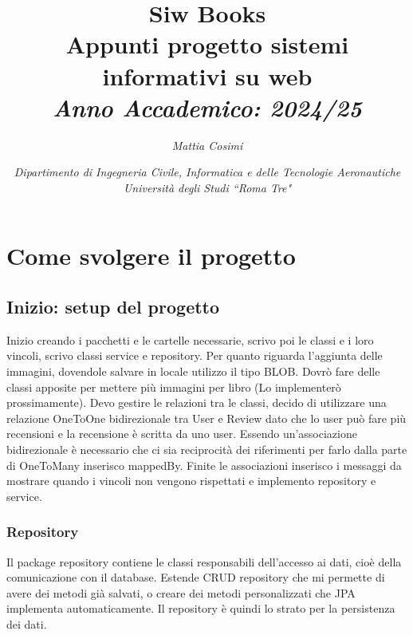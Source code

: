 \documentclass{article}
\numberwithin{equation}{subsection}
\begin{document}
\title{%
    \textbf{Siw Books}  \\ 
    \large Appunti progetto sistemi informativi su web\\
    \textit{Anno Accademico: 2024/25}}
\author{\textit{Mattia Cosimi}}
\date{\textit{Dipartimento di Ingegneria Civile, Informatica e delle Tecnologie Aeronautiche \\
Università degli Studi ``Roma Tre"}}

\maketitle


\clearpage

\pagestyle{fancy}
\fancyhead{}\fancyfoot{}
\fancyfoot[C]{\thepage}

\tableofcontents

\clearpage


\section{Come svolgere il progetto}
\subsection{Inizio: setup del progetto}
Inizio creando i pacchetti e le cartelle necessarie, scrivo poi le classi e i loro vincoli, scrivo classi service e repository. Per quanto riguarda l'aggiunta delle immagini, dovendole salvare in locale utilizzo il tipo BLOB. Dovrò fare delle classi apposite per mettere più immagini per libro (Lo implementerò prossimamente). Devo gestire le relazioni tra le classi, decido di utilizzare una relazione OneToOne bidirezionale tra User e Review dato che lo user può fare più recensioni e la recensione è scritta da uno user. Essendo un'associazione bidirezionale è necessario che ci sia reciprocità dei riferimenti per farlo dalla parte di OneToMany inserisco mappedBy. Finite le associazioni inserisco i messaggi da mostrare quando i vincoli non vengono rispettati e implemento repository e service.
\subsubsection{Repository}
Il package repository contiene le classi responsabili dell'accesso ai dati, cioè della comunicazione con il database. Estende CRUD repository che mi permette di avere dei metodi già salvati, o creare dei metodi personalizzati che JPA implementa automaticamente. Il repository è quindi lo strato per la persistenza dei dati.
\end{document}

